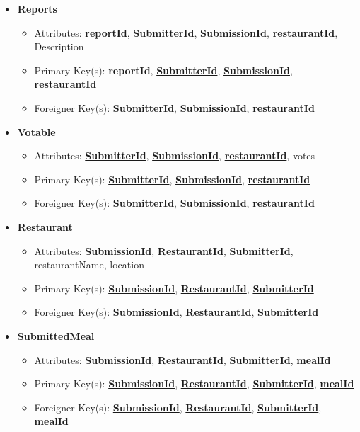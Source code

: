 \documentclass{article}
\begin{document}
\begin{itemize}
        \item \textbf{Reports}
        \begin{itemize}
            \item Attributes: \textbf{reportId}, \textbf{\underline{SubmitterId}}, \textbf{\underline{SubmissionId}}, \textbf{\underline{restaurantId}}, Description
            \item Primary Key(s): \textbf{reportId}, \textbf{\underline{SubmitterId}}, \textbf{\underline{SubmissionId}}, \textbf{\underline{restaurantId}}
            \item Foreigner Key(s): \textbf{\underline{SubmitterId}}, \textbf{\underline{SubmissionId}}, \textbf{\underline{restaurantId}}
        \end{itemize}
            
        \item \textbf{Votable}
        \begin{itemize}
            \item Attributes: \textbf{\underline{SubmitterId}}, \textbf{\underline{SubmissionId}}, \textbf{\underline{restaurantId}}, votes
            \item Primary Key(s): \textbf{\underline{SubmitterId}}, \textbf{\underline{SubmissionId}}, \textbf{\underline{restaurantId}}
            \item Foreigner Key(s): \textbf{\underline{SubmitterId}}, \textbf{\underline{SubmissionId}}, \textbf{\underline{restaurantId}}
        \end{itemize}

        \item \textbf{Restaurant}
        \begin{itemize}
            \item Attributes: \textbf{\underline{SubmissionId}}, \textbf{\underline{RestaurantId}}, \textbf{\underline{SubmitterId}}, restaurantName, location
            \item Primary Key(s): \textbf{\underline{SubmissionId}}, \textbf{\underline{RestaurantId}}, \textbf{\underline{SubmitterId}}
            \item Foreigner Key(s): \textbf{\underline{SubmissionId}}, \textbf{\underline{RestaurantId}}, \textbf{\underline{SubmitterId}}
        \end{itemize}

        \item \textbf{SubmittedMeal}
        \begin{itemize}
            \item Attributes: \textbf{\underline{SubmissionId}}, \textbf{\underline{RestaurantId}}, \textbf{\underline{SubmitterId}}, \textbf{\underline{mealId}}
            \item Primary Key(s): \textbf{\underline{SubmissionId}}, \textbf{\underline{RestaurantId}}, \textbf{\underline{SubmitterId}}, \textbf{\underline{mealId}}
            \item Foreigner Key(s): \textbf{\underline{SubmissionId}}, \textbf{\underline{RestaurantId}}, \textbf{\underline{SubmitterId}}, \textbf{\underline{mealId}}
        \end{itemize}


\end{itemize}
\end{document}
